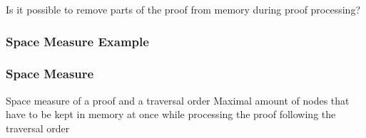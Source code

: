 \documentclass{beamer}
\begin{document}
%
%
%
%
%
%


\begin{frame}

Is it possible to remove parts of the proof from memory during proof processing?

\vspace{1cm}


\end{frame}

\begin{frame}
	\frametitle{Space Measure Example}
	
\end{frame}

\begin{frame}

\frametitle{Space Measure}

\begin{block}{Space measure of a proof and a traversal order}
	Maximal amount of nodes that have to be kept in memory at once while processing the proof following the traversal order
\end{block}

\end{frame}
\end{document}
